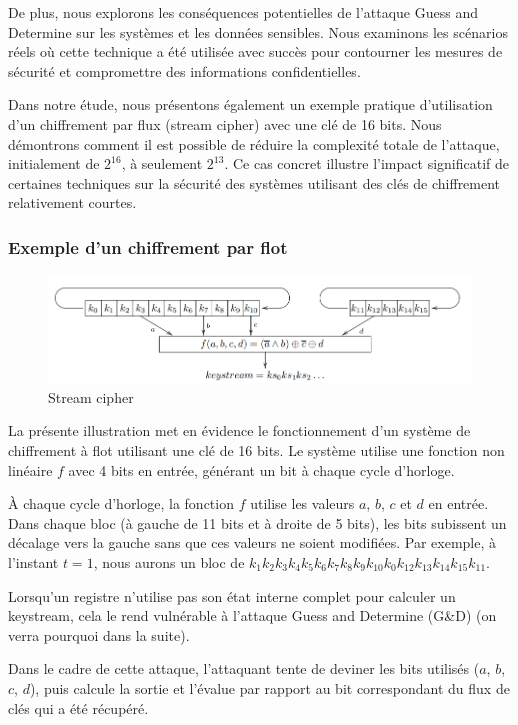 \documentclass{template}
\begin{document}
De plus, nous explorons les conséquences potentielles de l'attaque Guess and Determine sur les systèmes et les données sensibles. Nous examinons les scénarios réels où cette technique a été utilisée avec succès pour contourner les mesures de sécurité et compromettre des informations confidentielles.


Dans notre étude, nous présentons également un exemple pratique d'utilisation d'un chiffrement par flux (stream cipher) avec une clé de 16 bits. Nous démontrons comment il est possible de réduire la complexité totale de l'attaque, initialement de $2^{16}$, à seulement $2^{13}$. Ce cas concret illustre l'impact significatif de certaines techniques sur la sécurité des systèmes utilisant des clés de chiffrement relativement courtes.
\subsubsection{Exemple d'un chiffrement par flot}
\baselineskip=16pt
\begin{figure}
    \centering
    \includegraphics[width=\textwidth]{stream-cipher.PNG}
    \caption{Stream cipher}
    \label{fig:image}
\end{figure}

La présente illustration met en évidence le fonctionnement d'un système de chiffrement à flot utilisant une clé de 16 bits. Le système utilise une fonction non linéaire $f$ avec 4 bits en entrée, générant un bit à chaque cycle d'horloge.

À chaque cycle d'horloge, la fonction $f$ utilise les valeurs $a$, $b$, $c$ et $d$ en entrée. Dans chaque bloc (à gauche de 11 bits et à droite de 5 bits), les bits subissent un décalage vers la gauche sans que ces valeurs ne soient modifiées. Par exemple, à l'instant $t=1$, nous aurons un bloc de $k_1k_2k_3k_4k_5k_6k_7k_8k_9k_{10}k_0k_{12}k_{13}k_{14}k_{15}k_{11}$.

Lorsqu'un registre n'utilise pas son état interne complet pour calculer un keystream, cela le rend vulnérable à l'attaque Guess and Determine (G&D) (on verra pourquoi dans la suite).  

Dans le cadre de cette attaque, l'attaquant tente de deviner les bits utilisés ($a$, $b$, $c$, $d$), puis calcule la sortie et l'évalue par rapport au bit correspondant du flux de clés qui a été récupéré.
\end{document}
